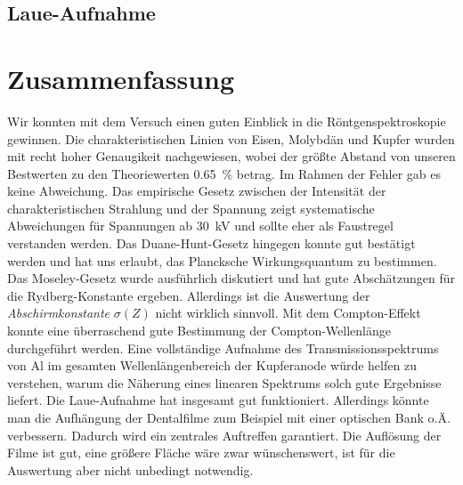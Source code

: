 \documentclass[paper=a4,fontsize=10pt,DIV=18,twocolumn,parskip=half]{scrartcl}
\numberwithin{equation}{section}    %
\begin{document}
\subsection{Laue-Aufnahme}
\label{07_Auswertung}


%
\section{Zusammenfassung}
\label{Zusammenfassung}

Wir konnten mit dem Versuch einen guten Einblick in die Röntgenspektroskopie
gewinnen. Die charakteristischen Linien von Eisen, Molybdän und Kupfer wurden mit
recht hoher Genaugikeit nachgewiesen, wobei der größte Abstand von unseren
Bestwerten zu den Theoriewerten 
\SI{0.65}{\percent} betrag. Im Rahmen der Fehler gab es keine Abweichung. 
 Das empirische Gesetz zwischen der Intensität der
charakteristischen Strahlung und der Spannung zeigt systematische Abweichungen
für Spannungen ab \SI{30}{\kilo\volt} und sollte eher als Faustregel verstanden
werden. Das Duane-Hunt-Gesetz hingegen konnte gut bestätigt werden und hat uns
erlaubt, das Plancksche Wirkungsquantum zu bestimmen. Das Moseley-Gesetz wurde
ausführlich diskutiert und hat gute Abschätzungen für die Rydberg-Konstante
ergeben. Allerdings ist die Auswertung der \emph{Abschirmkonstante} $\sigma(Z)$
nicht wirklich sinnvoll. Mit dem Compton-Effekt konnte eine überraschend gute
Bestimmung der Compton-Wellenlänge durchgeführt werden. Eine vollständige
Aufnahme des Transmissionsspektrums von Al im gesamten Wellenlängenbereich der
Kupferanode würde helfen zu verstehen, warum die Näherung eines linearen
Spektrums solch gute Ergebnisse liefert. Die Laue-Aufnahme hat insgesamt gut
funktioniert. Allerdings könnte man die Aufhängung der Dentalfilme zum Beispiel
mit einer optischen Bank o.Ä. verbessern. Dadurch wird ein zentrales 
Auftreffen garantiert. Die Auflösung 
der Filme ist gut, eine größere Fläche wäre zwar wünschenswert, ist für die
Auswertung aber nicht unbedingt notwendig. 
\end{document}
